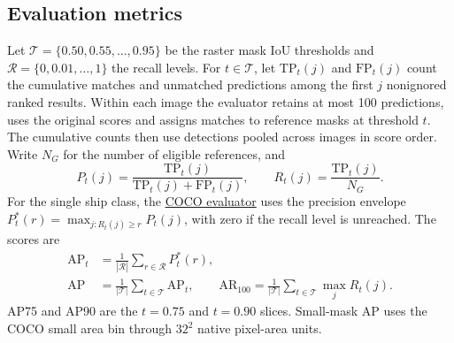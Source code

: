 \documentclass[journal]{IEEEtran}
\begin{document}
\subsection{Evaluation metrics}
\label{sec:metrics}
Let \(\mathcal T=\{0.50,0.55,\ldots,0.95\}\) be the raster mask IoU thresholds and \(\mathcal R=\{0,0.01,\ldots,1\}\) the recall levels. For \(t\in\mathcal T\), let \(\mathrm{TP}_t(j)\) and \(\mathrm{FP}_t(j)\) count the cumulative matches and unmatched predictions among the first \(j\) nonignored ranked results. Within each image the evaluator retains at most 100 predictions, uses the original scores and assigns matches to reference masks at threshold \(t\). The cumulative counts then use detections pooled across images in score order. Write \(N_G\) for the number of eligible references, and
\begin{equation}
 P_t(j)=\frac{\mathrm{TP}_t(j)}{\mathrm{TP}_t(j)+\mathrm{FP}_t(j)},
 \qquad R_t(j)=\frac{\mathrm{TP}_t(j)}{N_G}.
\end{equation}
For the single ship class, the \href{https://github.com/cocodataset/cocoapi/blob/master/PythonAPI/pycocotools/cocoeval.py}{COCO evaluator} uses the precision envelope \(P_t^*(r)=\max_{j:R_t(j)\ge r} P_t(j)\), with zero if the recall level is unreached. The scores are
\begin{equation}
\begin{aligned}
 \mathrm{AP}_t&=\frac{1}{|\mathcal R|}\sum_{r\in\mathcal R}P_t^*(r),\\
 \mathrm{AP}&=\frac{1}{|\mathcal T|}\sum_{t\in\mathcal T}\mathrm{AP}_t,\qquad
 \mathrm{AR}_{100}=\frac{1}{|\mathcal T|}\sum_{t\in\mathcal T}\max_j R_t(j).
\end{aligned}
\label{eq:coco-metrics}
\end{equation}
AP75 and AP90 are the \(t=0.75\) and \(t=0.90\) slices. Small-mask AP uses the COCO small area bin through \(32^2\) native pixel-area units.
\end{document}

